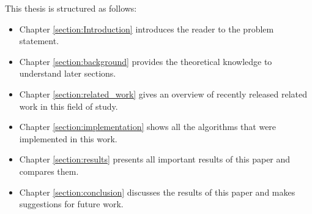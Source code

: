 This thesis is structured as follows:
\begin{itemize}

\item Chapter \ref{section:Introduction} introduces the reader to the problem statement.
\item Chapter \ref{section:background} provides the theoretical knowledge to understand later sections.
\item Chapter \ref{section:related_work} gives an overview of recently released related work in this field of study.
\item Chapter \ref{section:implementation} shows all the algorithms that were implemented in this work.
\item Chapter \ref{section:results} presents all important results of this paper and compares them.
\item Chapter \ref{section:conclusion} discusses the results of this paper and makes suggestions for future work.

\end{itemize}
